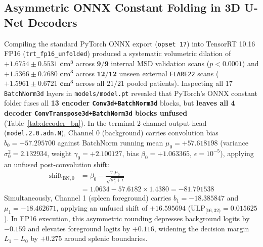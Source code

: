 \documentclass[10pt,twocolumn]{article}
\begin{document}
\subsection{Asymmetric ONNX Constant Folding in 3D U-Net Decoders}
Compiling the standard PyTorch ONNX export (\texttt{opset 17}) into TensorRT 10.16 FP16 (\texttt{trt\_fp16\_unfolded}) produced a systematic volumetric dilation of $\mathbf{+1.6754 \pm 0.5531\textbf{ cm}^3}$ across $\mathbf{9/9}$ internal MSD validation scans ($p < 0.0001$) and $\mathbf{+1.5366 \pm 0.7680\textbf{ cm}^3}$ across $\mathbf{12/12}$ unseen external \texttt{FLARE22} scans ($\mathbf{+1.5961 \pm 0.6721\textbf{ cm}^3}$ across all $21/21$ pooled patients). Inspecting all 17 \texttt{BatchNorm3d} layers in \texttt{models/model.pt} revealed that PyTorch's ONNX constant folder fuses all \textbf{13 encoder \texttt{Conv3d+BatchNorm3d}} blocks, but \textbf{leaves all 4 decoder \texttt{ConvTranspose3d+BatchNorm3d} blocks unfused} (Table~\ref{tab:decoder_bn}). In the terminal 2-channel output head (\texttt{model.2.0.adn.N}), Channel 0 (background) carries convolution bias $b_0 = +57.295700$ against BatchNorm running mean $\mu_0 = +57.618198$ (variance $\sigma_0^2 = 2.132934$, weight $\gamma_0 = +2.100127$, bias $\beta_0 = +1.063365$, $\epsilon = 10^{-5}$), applying an unfused post-convolution shift:
\begin{equation}
\begin{aligned}
    \text{shift}_{\text{BN}, 0} &= \beta_0 - \frac{\gamma_0 \mu_0}{\sqrt{\sigma_0^2 + \epsilon}} \\
    &= 1.0634 - 57.6182 \times 1.4380 = \mathbf{-81.791538}
\end{aligned}
\end{equation}
Simultaneously, Channel 1 (spleen foreground) carries $b_1 = -18.385847$ and $\mu_1 = -18.462671$, applying an unfused shift of $\mathbf{+16.595694}$ ($\text{ULP}_{[16,32)} = 0.015625$). In FP16 execution, this asymmetric rounding depresses background logits by $-0.159$ and elevates foreground logits by $+0.116$, widening the decision margin $L_1 - L_0$ by $+0.275$ around splenic boundaries.
\end{document}
